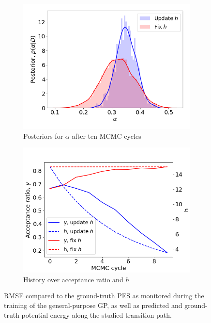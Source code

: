 \documentclass[11pt,a4paper]{article}
\begin{document}
\begin{figure}[ht]
    \centering
    \begin{subfigure}{.46\textwidth}
          \centering
          \includegraphics[width=1\textwidth]{figures/h_posterior.png}
          \caption{Posteriors for $\alpha$ after ten MCMC cycles} 
          \label{fig:h_posterior}
    \end{subfigure}%
    \begin{subfigure}{.46\textwidth}
          \centering
          \includegraphics[width=1\textwidth]{figures/h_evolution.png}
          \caption{History over acceptance ratio and $h$}
    \label{fig:h_evolution}
    \end{subfigure}
    \caption{RMSE compared to the ground-truth PES as monitored during the training of the general-purpose GP, as well as predicted and ground-truth potential energy along the studied transition path.}
    \label{fig:h}
\end{figure}
\end{document}
